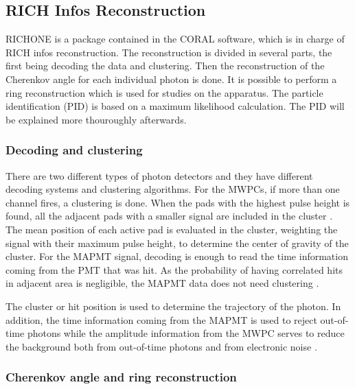 \subsection{RICH Infos Reconstruction}

RICHONE is a package contained in the CORAL software, which is in charge of RICH infos reconstruction. The reconstruction is divided in several parts, the first being decoding the data and clustering. Then the reconstruction of the Cherenkov angle for each individual photon is done. It is possible to perform a ring reconstruction which is used for studies on the apparatus. The particle identification (PID) is based on a maximum likelihood calculation. The PID will be explained more thouroughly afterwards.

\subsubsection*{Decoding and clustering}

There are two different types of photon detectors and they have different decoding systems and clustering algorithms. For the MWPCs, if more than one channel fires, a clustering is done. When the pads with the highest pulse height is found, all the adjacent pads with a smaller signal are included in the cluster \cite{RICHPID}. The mean position of each active pad is evaluated in the cluster, weighting the signal with their maximum pulse height, to determine the center of gravity of the cluster. For the MAPMT signal, decoding is enough to read the time information coming from the PMT that was hit. As the probability of having correlated hits in adjacent area is negligible, the MAPMT data does not need clustering \cite{RICHElec}.

The cluster or hit position is used to determine the trajectory of the photon. In addition, the time information coming from the MAPMT is used to reject out-of-time photons while the amplitude information from the MWPC serves to reduce the background both from out-of-time photons and from electronic noise \cite{RICHPID}.

\subsubsection*{Cherenkov angle and ring reconstruction}

